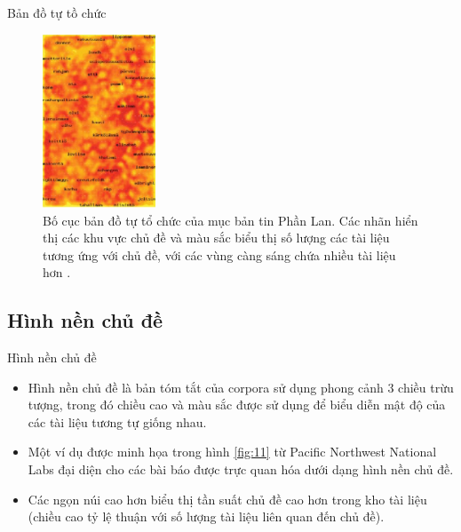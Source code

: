 \documentclass[10pt]{beamer}
\theoremstyle{remark}
\theoremstyle{definition}
\begin{document}
\begin{frame}{Bản đồ tự tồ chức}
	\begin{figure}[h!]
        \centering
        \includegraphics[width=0.3\textwidth]{10.png}
        \caption{Bố cục bản đồ tự tổ chức của mục bản tin Phần Lan.
        Các nhãn hiển thị các khu vực chủ đề và màu sắc biểu thị số lượng các tài liệu tương ứng với chủ đề, với các vùng càng sáng chứa nhiều tài liệu hơn \cite{454}.}
        \label{fig:10}
    \end{figure}
\end{frame}

\subsection{Hình nền chủ đề}

\begin{frame}{Hình nền chủ đề}
	\begin{itemize}
		\item Hình nền chủ đề là bản tóm tắt của corpora sử dụng phong cảnh 3 chiều trừu tượng, trong đó chiều cao và màu sắc được sử dụng để biểu diễn mật độ của các tài liệu tương tự giống nhau.
		\item Một ví dụ được minh họa trong hình \ref{fig:11} từ Pacific Northwest National Labs \cite{407} đại diện cho các bài báo được trực quan hóa dưới dạng hình nền chủ đề.
		\item Các ngọn núi cao hơn biểu thị tần suất chủ đề cao hơn trong kho tài liệu (chiều cao tỷ lệ thuận với số lượng tài liệu liên quan đến chủ đề).
	\end{itemize}
\end{frame}
\end{document}
